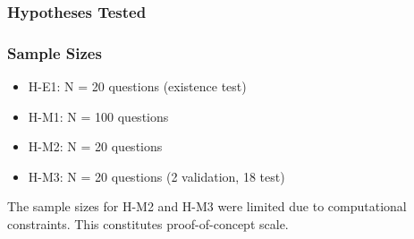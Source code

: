 
\subsubsection{Hypotheses Tested}

\begin{table}[htbp]
\centering
{}
\end{table}

\subsubsection{Sample Sizes}

\begin{itemize}
\item H-E1: N = 20 questions (existence test)
\item H-M1: N = 100 questions
\item H-M2: N = 20 questions
\item H-M3: N = 20 questions (2 validation, 18 test)
\end{itemize}

The sample sizes for H-M2 and H-M3 were limited due to computational constraints. This constitutes proof-of-concept scale.

